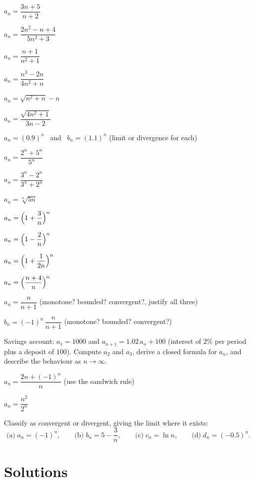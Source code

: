 \begin{problems}
  \item $a_{n}=\dfrac{3n+5}{n+2}$
  \item $a_{n}=\dfrac{2n^{2}-n+4}{5n^{2}+3}$
  \item $a_{n}=\dfrac{n+1}{n^{2}+1}$
  \item $a_{n}=\dfrac{n^{3}-2n}{4n^{2}+n}$
  \item $a_{n}=\sqrt{n^{2}+n}-n$
  \item $a_{n}=\dfrac{\sqrt{4n^{2}+1}}{3n-2}$
  \item $a_{n}=(0.9)^{n}$ \ and \ $b_{n}=(1.1)^{n}$ \quad (limit or
        divergence for each)
  \item $a_{n}=\dfrac{2^{n}+5^{n}}{5^{n}}$
  \item $a_{n}=\dfrac{3^{n}-2^{n}}{3^{n}+2^{n}}$
  \item $a_{n}=\sqrt[n]{5n}$
  \item $a_{n}=\Bigl(1+\dfrac{3}{n}\Bigr)^{n}$
  \item $a_{n}=\Bigl(1-\dfrac{2}{n}\Bigr)^{n}$
  \item $a_{n}=\Bigl(1+\dfrac{1}{2n}\Bigr)^{n}$
  \item $a_{n}=\Bigl(\dfrac{n+4}{n}\Bigr)^{n}$
  \item $a_{n}=\dfrac{n}{n+1}$ \quad (monotone? bounded? convergent?,
        justify all three)
  \item $b_{n}=(-1)^{n}\,\dfrac{n}{n+1}$ \quad (monotone? bounded?
        convergent?)
  \item Savings account: $a_{1}=1000$ and $a_{n+1}=1.02\,a_{n}+100$
        (interest of $2\%$ per period plus a deposit of $100$). Compute
        $a_{2}$ and $a_{3}$, derive a closed formula for $a_{n}$, and
        describe the behaviour as $n\to\infty$.
  \item $a_{n}=\dfrac{2n+(-1)^{n}}{n}$ \quad (use the sandwich rule)
  \item $a_{n}=\dfrac{n^{2}}{2^{n}}$
  \item Classify as convergent or divergent, giving the limit where it
        exists:
        \[
          \text{(a)}\; a_{n}=(-1)^{n},\qquad
          \text{(b)}\; b_{n}=5-\frac{3}{n},\qquad
          \text{(c)}\; c_{n}=\ln n,\qquad
          \text{(d)}\; d_{n}=(-0.5)^{n}.
        \]
\end{problems}

\section{Solutions}


